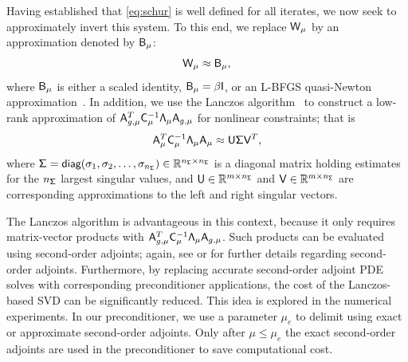 Having established that \eqref{eq:schur} is well defined for all iterates, we
now seek to approximately invert this system.  To this end, we replace
$\mathsf{W}_{\mu}$ by an approximation denoted by $\mathsf{B}_{\mu}$:
\begin{equation*}
\mathsf{W}_{\mu} \approx \mathsf{B}_{\mu},
\end{equation*}
where $\mathsf{B}_{\mu}$ is either a scaled identity, $\mathsf{B}_{\mu} = \beta
\mathsf{I}$, or an L-BFGS quasi-Newton approximation~\cite{liu:1989}.  In addition,
we use the Lanczos algorithm~\cite{saad:1992} to construct a low-rank
approximation of $\mathsf{A}_{g,\mu}^T \mathsf{C}_\mu^{-1} \mathsf{\Lambda}_\mu
\mathsf{A}_{g,\mu}$ for nonlinear constraints; that is
\begin{equation}\label{eq:svd}
  \mathsf{A}_\mu^T  \mathsf{C}_\mu^{-1}  \mathsf{\Lambda}_{\mu}\mathsf{A}_\mu
  \approx \mathsf{U} \mathsf{\Sigma} \mathsf{V}^T,
\end{equation}
where $\mathsf{\Sigma} = \textsf{diag}(\sigma_1,\sigma_2,\ldots,\sigma_{n_{\mathsf{\Sigma}}}) \in
\mathbb{R}^{n_{\mathsf{\Sigma}}\times n_{\mathsf{\Sigma}}}$ is a diagonal matrix holding estimates for the
$n_{\mathsf{\Sigma}}$ largest singular values, and $\mathsf{U} \in \mathbb{R}^{m\times n_{\mathsf{\Sigma}}}$ and
$\mathsf{V} \in \mathbb{R}^{m\times n_{\mathsf{\Sigma}}}$ are corresponding approximations to the
left and right singular vectors. 

\begin{remark}
  The Lanczos algorithm is advantageous in this context, because it only
  requires matrix-vector products with $\mathsf{A}_{g,\mu}^T \mathsf{C}_\mu^{-1}
  \mathsf{\Lambda}_\mu \mathsf{A}_{g,\mu}$.  Such products can be evaluated using
  second-order adjoints; again, see \cite{hicken:inexact2014} or
  \cite{dener:scitech2015} for further details regarding second-order adjoints.
  Furthermore, by replacing accurate second-order adjoint PDE solves with
  corresponding preconditioner applications, the cost of the Lanczos-based SVD
  can be significantly reduced.  This idea is explored in the numerical
  experiments.  In our preconditioner, we use a parameter $\mu_e$ 
   to delimit using exact or approximate second-order adjoints. Only after 
   $\mu \leq \mu_e $ the exact second-order adjoints are used in the preconditioner 
   to save computational cost. 
\end{remark}


